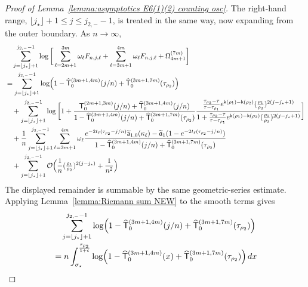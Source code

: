 \documentclass[a4paper]{article}
\numberwithin{equation}{section}
\begin{document}
\begin{proof}[Proof of Lemma~\ref{lemma:asymptotics E6(1)(2) counting osc}]

The right-hand range, $\lfloor j_\star\rfloor+1\le j\le j_{2,-}-1$, is treated
in the same way, now expanding from the outer boundary.  As $n\to\infty$,
\begin{align*}
&\quad \sum_{j=\lfloor j_{\star}\rfloor+1}^{j_{2,-}-1}
\log\bigg[
\sum_{\ell=2m+1}^{3m}\omega_{\ell}F_{n,j,\ell}
+\sum_{\ell=3m+1}^{4m}\omega_{\ell}F_{n,j,\ell}
+\Omega_{4m+1}^{(7m)}
\bigg]
\\
&=
\sum_{j=\lfloor j_{\star}\rfloor+1}^{j_{2,-}-1}
\log\Bigl(1-\widehat{\mathsf{T}}_0^{(3m+1,4m)}(j/n)+\widehat{\mathsf{T}}_0^{(3m+1,7m)}(\tau_{\rho_2})\Bigr)
\\
&\quad 
+\sum_{j=\lfloor j_{\star}\rfloor+1}^{j_{2,-}-1}
\log\bigg[
1+\frac{\mathsf{T}_0^{(2m+1,3m)}(j/n)+\widehat{\mathsf{T}}_0^{(3m+1,4m)}(j/n)}{1-\widehat{\mathsf{T}}_0^{(3m+1,4m)}(j/n)+\widehat{\mathsf{T}}_0^{(3m+1,7m)}(\tau_{\rho_2})}
\frac{
\frac{\tau_{\rho_2}-\tau}{\tau-\tau_{\rho_1}}
e^{\mathsf{k}(\rho_1)-\mathsf{k}(\rho_2)}
(\tfrac{\rho_1}{\rho_2})^{2(j-j_{\star}+1)}
}{
1+\frac{\tau_{\rho_2}-\tau}{\tau-\tau_{\rho_1}}e^{\mathsf{k}(\rho_1)-\mathsf{k}(\rho_2)}( \tfrac{\rho_1}{\rho_2})^{2(j-j_{\star}+1)}
}
\bigg]
\\
&\quad 
+\frac{1}{n}\sum_{j=\lfloor j_{\star}\rfloor+1}^{j_{2,-}-1}
\sum_{\ell=3m+1}^{4m}\omega_{\ell}
\frac{
e^{-2t_{\ell}(\tau_{\rho_2}-j/n)}
\widetilde{\mathsf{a}}_{1,0}(\kappa_{\ell})
-\widetilde{\mathfrak{a}}_1(1-e^{-2t_{\ell}(\tau_{\rho_2}-j/n)})
}{
1-\widehat{\mathsf{T}}_0^{(3m+1,4m)}(j/n)+\widehat{\mathsf{T}}_0^{(3m+1,7m)}(\tau_{\rho_2})
}
\\
&\quad 
+
\sum_{j=\lfloor j_{\star}\rfloor+1}^{j_{2,-}-1}
\mathcal{O}\Bigl(\frac{1}{n}(\tfrac{\rho_1}{\rho_2})^{2(j-j_{\star})}+\frac{1}{n^2}\Bigr)
\end{align*}
The displayed remainder is summable by the same geometric-series estimate.
Applying Lemma~\ref{lemma:Riemann sum NEW} to the smooth terms gives
\begin{align*}
&\quad 
\sum_{j=\lfloor j_{\star}\rfloor+1}^{j_{2,-}-1}
\log\Bigl(1-\widehat{\mathsf{T}}_0^{(3m+1,4m)}(j/n)+\widehat{\mathsf{T}}_0^{(3m+1,7m)}(\tau_{\rho_2})\Bigr)
\\
&=
n\int_{\sigma_{\star}}^{\frac{\tau_{\rho_2}}{1+\epsilon}}
\log\Bigl(1-\widehat{\mathsf{T}}_0^{(3m+1,4m)}(x)+\widehat{\mathsf{T}}_0^{(3m+1,7m)}(\tau_{\rho_2})\Bigr)\,dx
\\

\end{align*}
\end{proof}
\end{document}
